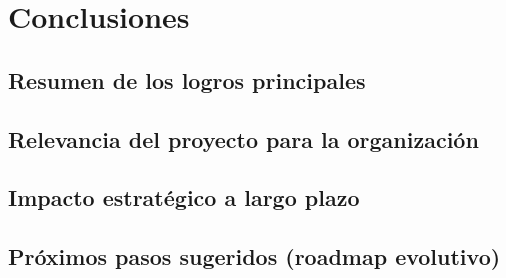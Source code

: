 \chapter{Conclusiones}
\section{Resumen de los logros principales}
\section{Relevancia del proyecto para la organización}
\section{Impacto estratégico a largo plazo}
\section{Próximos pasos sugeridos (roadmap evolutivo)}

